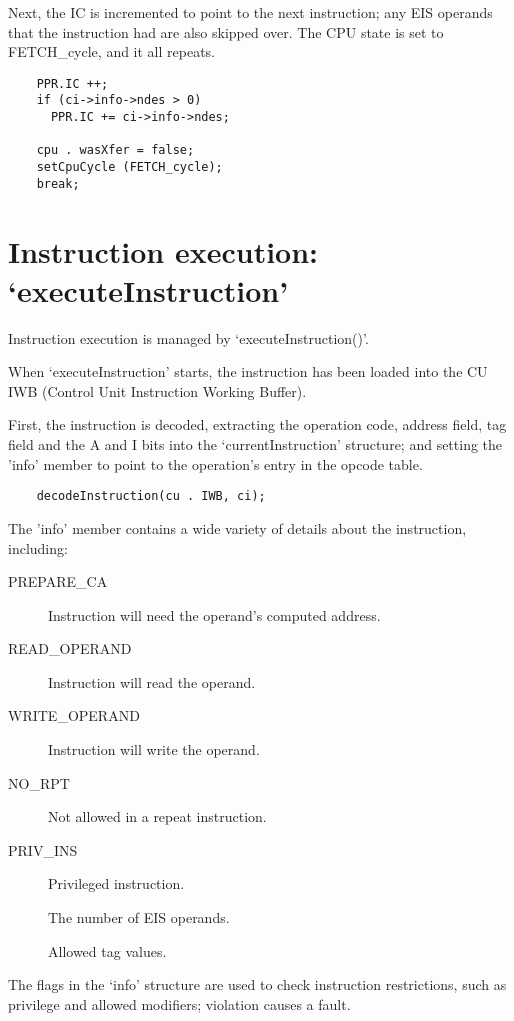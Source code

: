 \documentclass[notitlepage]{report}
\begin{document}
Next, the IC is incremented to point to the next instruction; any
EIS operands that the instruction had are also skipped over.
The CPU state is set to FETCH\_cycle, and it all repeats.

\begin{verbatim}
    PPR.IC ++;
    if (ci->info->ndes > 0)
      PPR.IC += ci->info->ndes;

    cpu . wasXfer = false;
    setCpuCycle (FETCH_cycle);
    break;
\end{verbatim}


\section{Instruction execution: `executeInstruction'}

Instruction execution is managed by `executeInstruction()'.

When `executeInstruction' starts, the instruction has been loaded
into the CU IWB (Control Unit Instruction Working Buffer).

First, the instruction is decoded, extracting the operation code, address
field, tag field and the A and I bits into the `currentInstruction'
structure; and setting the 'info' member to point to the operation's
entry in the opcode table.

\begin{verbatim}
    decodeInstruction(cu . IWB, ci);
\end{verbatim}

The 'info' member contains a wide variety of details about the instruction,
including:

\begin{description}
\item [PREPARE\_CA] Instruction will need the operand's computed address.
\item [READ\_OPERAND] Instruction will read the operand.
\item [WRITE\_OPERAND] Instruction will write the operand.
\item [NO\_RPT] Not allowed in a repeat instruction.
\item [PRIV\_INS] Privileged instruction.
\item [] The number of EIS operands.
\item [] Allowed tag values.
\end{description}

The flags in the `info' structure are used to check instruction restrictions, 
such as privilege and allowed modifiers; violation causes a fault.
\end{document}
